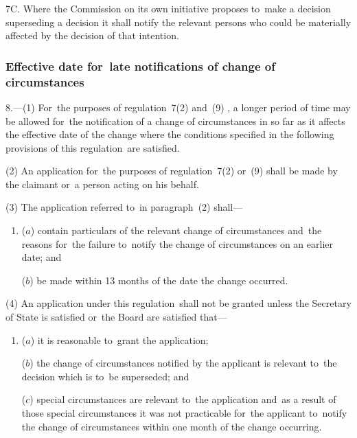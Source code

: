 \documentclass[12pt,a4paper]{article}
\begin{document}
{7C.  Where the 
Commission  %
on 
its  %
own initiative proposes to~make a decision superseding a decision 
it  %
shall notify the relevant persons who could be materially affected by the decision of that intention.

}

\subsubsection[8. Effective date for~late notifications of change of circumstances]{Effective date for~late notifications of change of circumstances}

8.—(1) For~the purposes of regulation~7(2)
and~(9)%
, a longer period of time may be allowed for~the notification of a change of circumstances in so far as it affects the effective date of the change where the conditions specified in the following provisions of this regulation~are satisfied.

(2) An application for~the purposes of regulation~7(2) 
or~(9)  %
shall be made by the claimant or~a person acting on his behalf.

(3) The application referred to~in paragraph~(2) shall—
\begin{enumerate}\item[]
($a$) contain particulars of the relevant change of circumstances and~the reasons for~the failure to~notify the change of circumstances on an earlier date; and

($b$) be made within 13 months of the date the change occurred.
\end{enumerate}

(4) An application under this regulation~shall not be granted unless the Secretary of State is satisfied 
or~the Board are satisfied  %
that—
\begin{enumerate}\item[]
($a$) it is reasonable to~grant the application;

($b$) the change of circumstances notified by the applicant is relevant to~the decision which is to~be superseded; and

($c$) special circumstances are relevant to~the application and~as a result of those special circumstances it was not practicable for~the applicant to~notify the change of circumstances within one month of the change occurring.
\end{enumerate}
\end{document}
